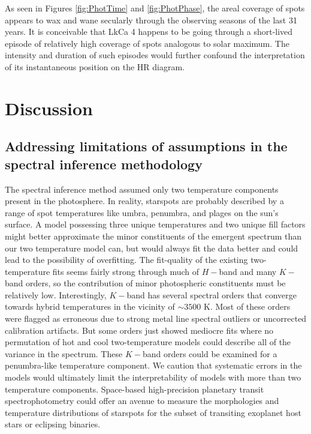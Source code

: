 \documentclass[twocolumn]{emulateapj}%
\begin{document}
As seen in Figures \ref{fig:PhotTime} and \ref{fig:PhotPhase}, the areal coverage of spots appears to wax and wane secularly through the observing seasons of the last 31 years.  It is conceivable that LkCa 4 happens to be going through a short-lived episode of relatively high coverage of spots analogous to solar maximum.  The intensity and duration of such episodes would further confound the interpretation of its instantaneous position on the HR diagram.

\section{Discussion}

\subsection{Addressing limitations of assumptions in the spectral inference methodology}

The spectral inference method assumed only two temperature components present in the photosphere.  In reality, starspots are probably described by a range of spot temperatures like umbra, penumbra, and plages on the sun's surface.  A model possessing three unique temperatures and two unique fill factors might better approximate the minor constituents of the emergent spectrum than our two temperature model can, but would always fit the data better and could lead to the possibility of overfitting.  The fit-quality of the existing two-temperature fits seems fairly strong through much of $H-$band and many $K-$band orders, so the contribution of minor photospheric constituents must be relatively low.  Interestingly, $K-$band has several spectral orders that converge towards hybrid temperatures in the vicinity of $\sim3500$ K.  Most of these orders were flagged as erroneous due to strong metal line spectral outliers or uncorrected calibration artifacts.  But some orders just showed mediocre fits where no permutation of hot and cool two-temperature models could describe all of the variance in the spectrum.  These $K-$band orders could be examined for a penumbra-like temperature component.  We caution that systematic errors in the models would ultimately limit the interpretability of models with more than two temperature components.  Space-based high-precision planetary transit spectrophotometry could offer an avenue to measure the morphologies and temperature distributions of starspots for the subset of transiting exoplanet host stars or eclipsing binaries.
\end{document}
